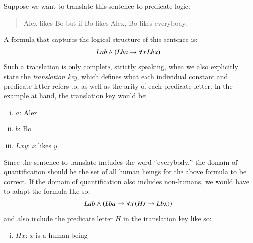 \documentclass[nobib,nofonts]{tufte-handout}
\begin{document}
Suppose we want to translate this sentence to predicate logic:
\begin{quote}
Alex likes Bo but if Bo likes Alex, Bo likes everybody.
\end{quote}
A formula that captures the logical structure of this sentence is:
\begin{align*}
  Lab \wedge (Lba \rightarrow \forall x \thinspace Lbx)
\end{align*}
Such a translation is only complete, strictly speaking, when we also explicitly state the \emph{translation key}, which defines what each individual constant and predicate letter refers to, as well as the arity of each predicate letter.
In the example at hand, the translation key would be:
\begin{enumerate}[(i)]
  \item $a$: Alex
  \item $b$: Bo
  \item $Lxy$: $x$ likes $y$
\end{enumerate}
Since the sentence to translate includes the word ``everybody,'' the domain of quantification should be the set of all human beings for the above formula to be correct.
If the domain of quantification also includes non-humans, we would have to adapt the formula like so:
\begin{align*}
  Lab \wedge (Lba \rightarrow \forall x \thinspace (Hx \rightarrow Lbx))
\end{align*}
and also include the predicate letter $H$ in the translation key like so:
\begin{enumerate}[(iv)]
  \item $Hx$: $x$ is a human being
\end{enumerate}
\end{document}

